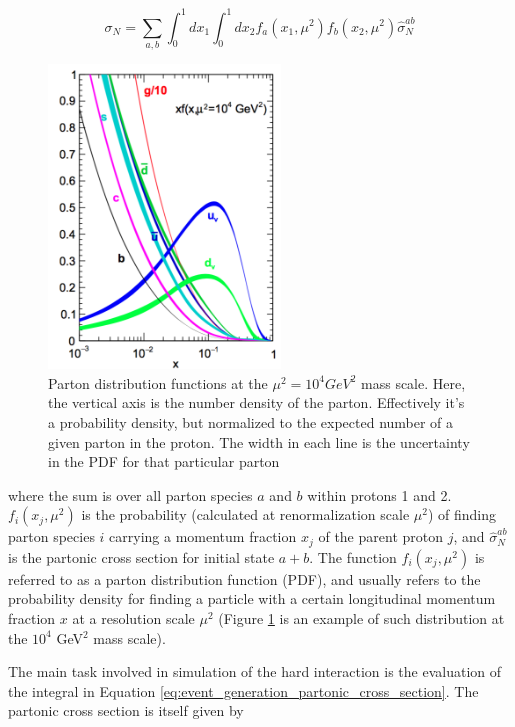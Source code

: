 \begin{equation}
\label{eq:event_generation_partonic_cross_section}
\sigma_{N} = \sum_{a,b}\int_{0}^{1}dx_{1}\int_{0}^{1}dx_{2}f_{a}(x_{1},\mu^{2})f_{b}(x_{2},\mu^{2})\hat{\sigma}_{N}^{ab}
\end{equation}

\begin{figure}[h]
 	\centering
 	\includegraphics[width=0.55\textwidth]{figures/pdfs.png}
 	\singlespace
 	\caption{Parton distribution functions at the $\mu^{2}=10^{4}GeV^{2}$ mass scale. Here, the vertical axis is the number density of the parton. Effectively it's a probability density, but normalized to the expected number of a given parton in the proton. The width in each line is the uncertainty in the PDF for that particular parton\cite{Martin:2009iq}}
 	\label{fig:pdfs}
 \end{figure}

where the sum is over all parton species $a$ and $b$ within protons 1 and 2. $f_{i}(x_{j},\mu^{2})$ is the probability (calculated at renormalization scale $\mu^{2}$) of finding parton species $i$ carrying a momentum fraction $x_{j}$ of the parent proton $j$, and $\hat{\sigma}_{N}^{ab}$ is the partonic cross section for initial state $a+b$. The function $f_{i}(x_{j},\mu^{2})$ is referred to as a parton distribution function (PDF), and usually refers to the probability density for finding a particle with a certain longitudinal momentum fraction $x$ at a resolution scale $\mu^{2}$ (Figure \ref{fig:pdfs} is an example of such distribution at the $10^{4}$ GeV$^{2}$ mass scale).

 The main task involved in simulation of the hard interaction is the evaluation of the integral in Equation \ref{eq:event_generation_partonic_cross_section}. The partonic cross section is itself given by

